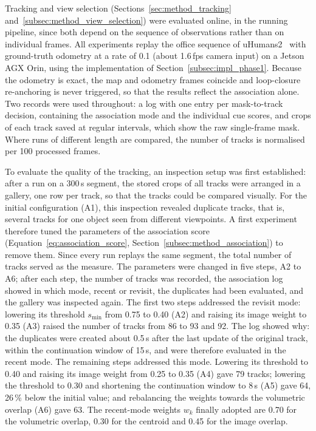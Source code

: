 {\small Tracking and view selection (Sections~\ref{sec:method_tracking} and~\ref{subsec:method_view_selection}) were evaluated online, in the running pipeline, since both depend on the sequence of observations rather than on individual frames. All experiments replay the office sequence of uHumans2~\cite{rosinol2021kimera} with ground-truth odometry at a rate of 0.1 (about 1.6\,fps camera input) on a Jetson AGX Orin, using the implementation of Section~\ref{subsec:impl_phase1}. Because the odometry is exact, the map and odometry frames coincide and loop-closure re-anchoring is never triggered, so that the results reflect the association alone. Two records were used throughout: a log with one entry per mask-to-track decision, containing the association mode and the individual cue scores, and crops of each track saved at regular intervals, which show the raw single-frame mask. Where runs of different length are compared, the number of tracks is normalised per 100 processed frames.\par}

{\small To evaluate the quality of the tracking, an inspection setup was first established: after a run on a 300\,s segment, the stored crops of all tracks were arranged in a gallery, one row per track, so that the tracks could be compared visually. For the initial configuration (A1), this inspection revealed duplicate tracks, that is, several tracks for one object seen from different viewpoints. A first experiment therefore tuned the parameters of the association score (Equation~\ref{eq:association_score}, Section~\ref{subsec:method_association}) to remove them. Since every run replays the same segment, the total number of tracks served as the measure. The parameters were changed in five steps, A2 to A6; after each step, the number of tracks was recorded, the association log showed in which mode, recent or revisit, the duplicates had been evaluated, and the gallery was inspected again. The first two steps addressed the revisit mode: lowering its threshold $s_{\min}$ from 0.75 to 0.40 (A2) and raising its image weight to 0.35 (A3) raised the number of tracks from 86 to 93 and 92. The log showed why: the duplicates were created about 0.5\,s after the last update of the original track, within the continuation window of 15\,s, and were therefore evaluated in the recent mode. The remaining steps addressed this mode. Lowering its threshold to 0.40 and raising its image weight from 0.25 to 0.35 (A4) gave 79 tracks; lowering the threshold to 0.30 and shortening the continuation window to 8\,s (A5) gave 64, 26\,\% below the initial value; and rebalancing the weights towards the volumetric overlap (A6) gave 63. The recent-mode weights $w_k$ finally adopted are 0.70 for the volumetric overlap, 0.30 for the centroid and 0.45 for the image overlap.\par}

